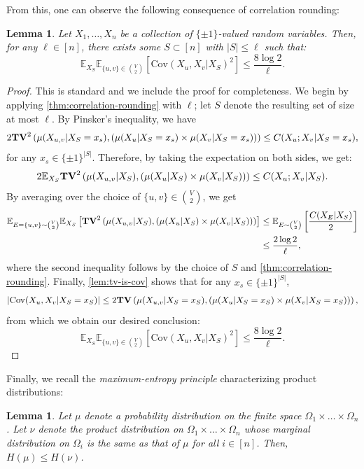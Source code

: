 \documentclass[11pt, oneside, english]{article}
\newcommand{\bE}{\mathbb{E}}
\newcommand{\Cov}{\mathrm{Cov}}
\newcommand{\E}{\bE}      %
\newcommand{\TV}{{\bf TV}}
\newtheorem{lemma}[theorem]{Lemma}
\theoremstyle{definition}
\theoremstyle{plain}
\begin{document}
From this, one can observe the following consequence of correlation rounding:%
\begin{lemma}
\label{lemma:covariance-corr-rounding}
Let $X_1,\dots, X_n$ be a collection of $\{\pm 1\}$-valued random variables. Then, for any $\ell \in [n]$, there exists some $S \subset [n]$ with $|S| \leq \ell$ such that:
$$\E_{X_S} \E_{\{u,v\} \in {V \choose 2}}\left[\Cov(X_u,X_v | X_S)^2\right] \le \frac{8\log 2}{\ell}.$$
\end{lemma}
\begin{proof}
This is standard and we include the proof for completeness.
We begin by applying \cref{thm:correlation-rounding} with $\ell$; let $S$ denote the resulting set of size at most $\ell$. 
By Pinsker's inequality, we have
$$2\TV^2\left(\mu(X_{u,v} | X_S=x_s), \left(\mu(X_u | X_S=x_s) \times \mu(X_v | X_S=x_s)\right)\right) \le C(X_u;X_v | X_S=x_s),$$
for any $x_s \in \{\pm 1\}^{|S|}$. 
Therefore, by taking the expectation on both sides, we get:
\[ 2\E_{X_S} \TV^2\left(\mu(X_{u,v} | X_S), \left(\mu(X_u | X_S) \times \mu(X_v | X_S)\right)\right) \le C(X_u;X_v | X_S). \] 
By averaging over the choice of $\{u,v\} \in \binom{V}{2}$, we get
\begin{align*}
\E_{E=\{u,v\} \sim {V \choose 2}}\E_{X_S}\left[\TV^2\left(\mu(X_{u,v} | X_S), \left(\mu(X_u | X_S) \times \mu(X_v | X_S)\right)\right)\right] &\le \E_{E \sim \binom{V}{2}}\left[\frac{C(X_E|X_S)}{2}\right]\\
 & \leq \frac{2\log 2}{\ell},
\end{align*}
where the second inequality follows by the choice of $S$ and \cref{thm:correlation-rounding}. 
Finally, \cref{lem:tv-is-cov} shows that for any $x_s \in \{\pm 1\}^{|S|}$, 
$$|\Cov(X_u,X_v | X_S = x_S)| \leq 2\TV\left(\mu(X_{u,v} | X_S = x_S), \left(\mu(X_u | X_S = x_S) \times \mu(X_v | X_S = x_S)\right)\right),$$ from which we obtain our desired conclusion: 
\begin{equation}\label{eqn:cov-sq-bound}
\E_{X_S} \E_{\{u,v\} \in {V \choose 2}}\left[\Cov(X_u,X_v | X_S)^2\right] \le \frac{8\log 2}{\ell}.
\end{equation}
\end{proof}
Finally, we recall the \emph{maximum-entropy principle} characterizing product distributions:
\begin{lemma}
\label{lemma:entropy-first-moments}
Let $\mu$ denote a probability distribution on the finite space $\Omega_{1}\times \dots \times \Omega_{n}$. Let $\nu$ denote the product distribution on $\Omega_{1}\times \dots \times \Omega_{n}$ whose marginal distribution on $\Omega_{i}$ is the same as that of $\mu$ for all $i \in [n]$. Then, $H(\mu) \leq H(\nu)$.  
\end{lemma}
\end{document}
